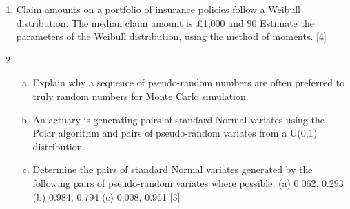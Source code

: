 \documentclass[a4paper,12pt]{article}
\begin{document}
\begin{enumerate}
\item 
Claim amounts on a portfolio of insurance policies follow a Weibull distribution. The
median claim amount is £1,000 and 90%
Estimate the parameters of the Weibull distribution, using the method of moments. [4]

\item 

\begin{enumerate}[(a)]  
\item Explain why a sequence of pseudo-random numbers are often preferred to
truly random numbers for Monte Carlo simulation.

\item An actuary is generating pairs of standard Normal variates using the Polar algorithm
and pairs of pseudo-random variates from a U(0,1) distribution.
\item 
Determine the pairs of standard Normal variates generated by the following
pairs of pseudo-random variates where possible.
(a) 0.062, 0.293
(b) 0.984, 0.794
(c) 0.008, 0.961
[3]
\end{enumerate}
\end{enumerate}
\newpage
\end{document}
